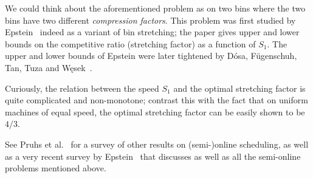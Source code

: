 We could think about the aforementioned problem as \binstretch on two
bins where the two bins have two different \emph{compression factors}.
This problem was first studied by Epstein~\cite{epsteinrevisited}
indeed as a variant of bin stretching; the paper gives upper and lower
bounds on the competitive ratio (stretching factor) as a function of
$S_1$.  The upper and lower bounds of Epstein were later tightened by
Dósa, Fügenschuh, Tan, Tuza and Węsek~\cite{dosastretching}.

Curiously, the relation between the speed $S_1$ and the optimal
stretching factor is quite complicated and non-monotone; contrast this
with the fact that on uniform machines of equal speed, the optimal
stretching factor can be easily shown to be $4/3$.

See Pruhs et al.~\cite{PST04} for a survey of other results on
(semi-)online scheduling, as well as a very recent survey by
Epstein~\cite{epstein18} that discusses \binstretch as well as all the
semi-online problems mentioned above.



